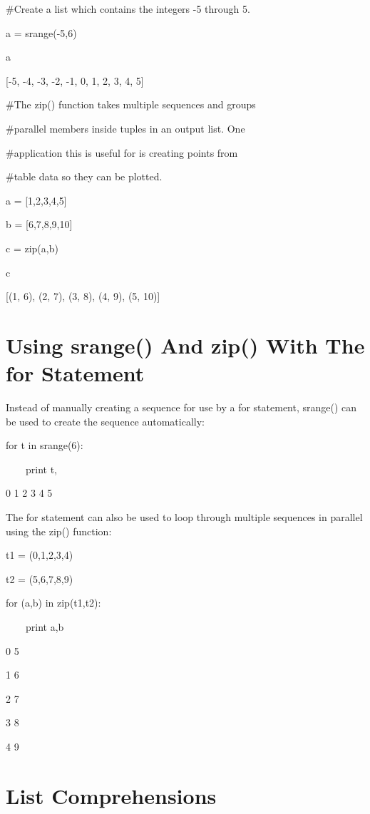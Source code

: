 \documentclass[12pt,oneside]{book}
\begin{document}
\#Create a list which contains the integers {}-5 through 5.

a = srange({}-5,6)

a

{\textbar}

[{}-5, {}-4, {}-3, {}-2, {}-1, 0, 1, 2, 3, 4, 5]

\#The zip() function takes multiple sequences and groups

\#parallel members inside tuples in an output list. One

\#application this is useful for is creating points from

\#table data so they can be plotted.

a = [1,2,3,4,5]

b = [6,7,8,9,10]

c = zip(a,b)

c

{\textbar}

[(1, 6), (2, 7), (3, 8), (4, 9), (5, 10)]

\section[Using srange() And zip() With The for Statement]{ Using srange() And zip() With The for Statement}

Instead of manually creating a sequence for use by a for statement, srange() can be used to create the sequence automatically:


for t in srange(6):

\ \ \ \ print t,

{\textbar}

0 1 2 3 4 5


The for statement can also be used to loop through multiple sequences in parallel using the zip() function: 

t1 = (0,1,2,3,4)

t2 = (5,6,7,8,9)

for (a,b) in zip(t1,t2):

\ \ \ \ print a,b

{\textbar}

0 5

1 6

2 7

3 8

4 9

\section[List Comprehensions]{List Comprehensions}
\end{document}
